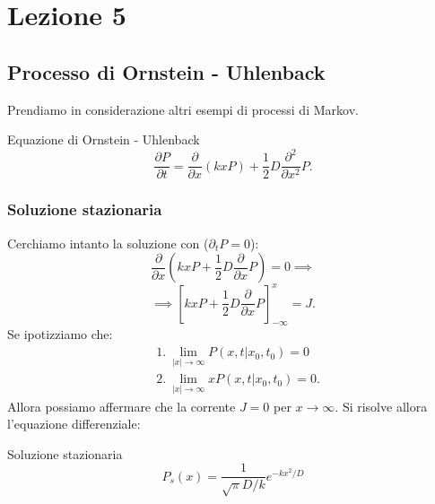 \section{Lezione 5}%
\label{sub:Lezione 5}
\subsection{Processo di Ornstein - Uhlenback}%
\label{sub:Processo di Ornstein - Uhlenback}
Prendiamo in considerazione altri esempi di processi di Markov.
\begin{redbox}{Equazione di Ornstein - Uhlenback}
    \[
	\frac{\partial P}{\partial t} = \frac{\partial }{\partial x} (kxP) + \frac{1}{2}D\frac{\partial ^2}{\partial x^2} P
    .\] 
\end{redbox}
\noindent
\subsubsection{Soluzione stazionaria}%
\label{subsub:Soluzione stazionaria}
Cerchiamo intanto la soluzione con ($\partial_{t}P=0$):
\[
    \frac{\partial }{\partial x} \left(kxP + \frac{1}{2}D \frac{\partial }{\partial x} P\right) = 0 \implies
\] 
\[
    \implies  \left[kxP + \frac{1}{2}D \frac{\partial }{\partial x} P\right]_{-\infty}^{x} = J
.\] 
Se ipotizziamo che:
\[\begin{aligned}
    & 1. \ \lim_{\left|x\right| \to \infty} P(x, t|x_0,t_0) = 0 \\
    & 2. \ \lim_{\left|x\right| \to \infty} xP(x, t|x_0,t_0) = 0
.\end{aligned}\]
Allora possiamo affermare che la corrente $J=0$ per $x\to \infty$. Si risolve allora l'equazione differenziale:
\begin{bluebox}{Soluzione stazionaria}
    \begin{equation}
	P_s(x) = \frac{1}{\sqrt{\pi} D /k}e^{-kx^2 / D} \label{eq:5_staz}
    \end{equation}
\end{bluebox}
\noindent
